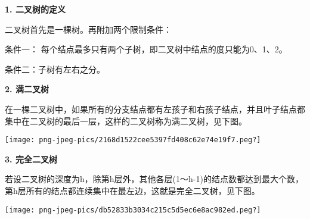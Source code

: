 {\textbf{1. 二叉树的定义}}

{二叉树首先是一棵树。再附加两个限制条件：}

{{条件一：} 每个结点最多只有两个子树，即二叉树中结点的度只能为0、1、2。}

{{条件二：}子树有左右之分。}{}

{\textbf{2. 满二叉树}}

{在一棵二叉树中，{如果所有的分支结点都有左孩子和右孩子结点，并且叶子结点都集中在二叉树的最后一层}，这样的二叉树称为满二叉树，见下图。}

{\texttt{[image: png-jpeg-pics/2168d1522cee5397fd408c62e74e19f7.peg?]}\\
\hspace*{0.333em}}

{\textbf{3. 完全二叉树}}

{若设二叉树的深度为h，除第h层外，其他各层(1～h-1)的结点数都达到最大个数，{第h层所有的结点都连续集中在最左边}，这就是完全二叉树，见下图。}

{}

\texttt{[image: png-jpeg-pics/db52833b3034c215c5d5ec6e8ac982ed.peg?]}
